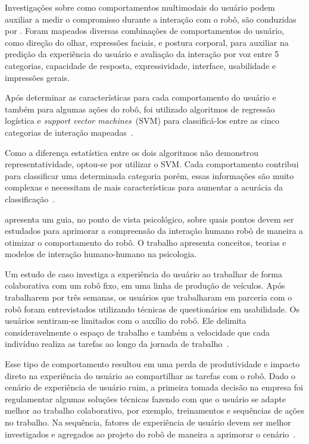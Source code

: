 Investigações sobre como comportamentos multimodais do usuário podem auxiliar a medir o compromisso durante a interação com o robô, são conduzidas por \textcite{jokinen:2015}. Foram mapeados diversas combinações de comportamentos do usuário, como direção do olhar, expressões faciais, e postura corporal, para auxiliar na predição da experiência do usuário e avaliação da interação por voz entre 5 categorias, capacidade de resposta, expressividade, interface, usabilidade e impressões gerais.

Após determinar as características para cada comportamento do usuário e também para algumas ações do robô, foi utilizado algoritmos de regressão logística e \emph{support vector machines}~(SVM) para classificá-los entre as cinco categorias de interação mapeadas~\cite{jokinen:2015}.

Como a diferença estatística entre os dois algoritmos não demonstrou representatividade, optou-se por utilizar o SVM. Cada comportamento contribui para classificar uma determinada categoria porém, essas informações são muito complexas e necessitam de mais características para aumentar a acurácia da classificação~\cite{jokinen:2015}.

\textcite{broadbent:2016} apresenta um guia, no ponto de vista psicológico, sobre quais pontos devem ser estudados para aprimorar a compreensão da interação humano robô de maneira a otimizar o comportamento do robô. O trabalho apresenta conceitos, teorias e modelos de interação humano-humano na psicologia.

Um estudo de caso investiga a experiência do usuário ao trabalhar de forma colaborativa com um robô fixo, em uma linha de produção de veículos. Após trabalharem por três semanas, os usuários que trabalharam em parceria com o robô foram entrevistados utilizando técnicas de questionários em usabilidade. Os usuários sentiram-se limitados com o auxílio do robô. Ele delimita consideravelmente o espaço de trabalho e também a velocidade que cada indivíduo realiza as tarefas ao longo da jornada de trabalho~\cite{weiss:2016}.

Esse tipo de comportamento resultou em uma perda de produtividade e impacto direto na experiência do usuário ao compartilhar as tarefas com o robô. Dado o cenário de experiência de usuário ruim, a primeira tomada decisão na empresa foi regulamentar algumas soluções técnicas fazendo com que o usuário se adapte melhor ao trabalho colaborativo, por exemplo, treinamentos e sequências de ações no trabalho. Na sequência, fatores de experiência de usuário devem ser melhor investigados e agregados ao projeto do robô de maneira a aprimorar o cenário~\cite{weiss:2016}.

